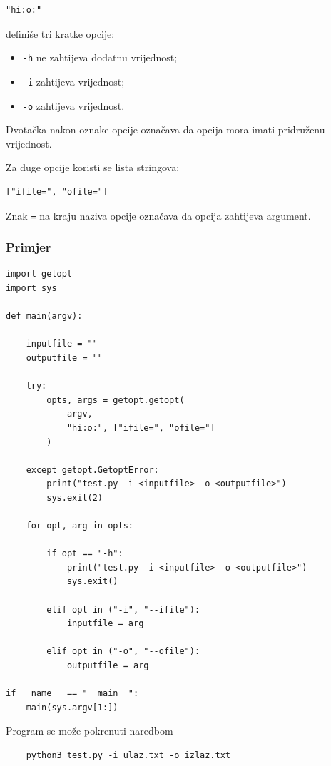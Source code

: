 \begin{verbatim}
"hi:o:"
\end{verbatim}

definiše tri kratke opcije:

\begin{itemize}
	\item \texttt{-h} ne zahtijeva dodatnu vrijednost;
	\item \texttt{-i} zahtijeva vrijednost;
	\item \texttt{-o} zahtijeva vrijednost.
\end{itemize}

Dvotačka nakon oznake opcije označava da opcija mora imati pridruženu vrijednost.

Za duge opcije koristi se lista stringova:

\begin{verbatim}
["ifile=", "ofile="]
\end{verbatim}

Znak \texttt{=} na kraju naziva opcije označava da opcija zahtijeva argument.

\subsubsection*{Primjer}

\begin{verbatim}
import getopt
import sys

def main(argv):

    inputfile = ""
    outputfile = ""

    try:
        opts, args = getopt.getopt(
            argv,
            "hi:o:", ["ifile=", "ofile="]
        )

    except getopt.GetoptError:
        print("test.py -i <inputfile> -o <outputfile>")
        sys.exit(2)

    for opt, arg in opts:

        if opt == "-h": 
            print("test.py -i <inputfile> -o <outputfile>")
            sys.exit()

        elif opt in ("-i", "--ifile"):
            inputfile = arg

        elif opt in ("-o", "--ofile"):
            outputfile = arg

if __name__ == "__main__":
    main(sys.argv[1:])
\end{verbatim}

Program se može pokrenuti naredbom

\begin{verbatim}
	python3 test.py -i ulaz.txt -o izlaz.txt
\end{verbatim}

